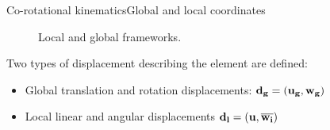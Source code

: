 \documentclass{beamer}
\begin{document}

\begin{frame}{Co-rotational kinematics}{Global and local coordinates}
\begin{figure}
    \centering
    \def\svgwidth{50mm}
	
	\caption{Local and global frameworks.}
    \label{fig:my_label}
\end{figure}

Two types of displacement describing the element are defined:
\pause
\begin{itemize}
\item Global translation and rotation displacements: $\bf{d_g} = (\bf{u_g},\bf{w_g})$
\pause
\item Local linear and angular displacements $\bf{d_l} =(u, \bf{\overline{w_i}}) $
 \end{itemize}

\end{frame}





\end{document}
